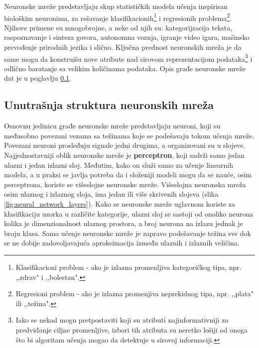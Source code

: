 \documentclass[a4paper]{article}
\begin{document}
Neuronske mreže predstavljaju skup statističkih modela učenja inspirisan biološkim neuronima, za rešavanje klasifikacionih\footnote{Klasifikacioni problem - ako je izlazna promenljiva kategoričkog tipa, npr. ,,zdrav" i ,,bolestan".} i regresionih problema\footnote{Regresioni problem - ako je izlazna promenjiva neprekidnog tipa, npr. ,,plata" ili ,,težina".}. Njihove primene su mnogobrojne, a neke od njih su: kategorijzacija teksta,
 raspoznavanje i sinteza govora, autonomna voznja, igranje video igara, mašinsko prevođenje prirodnih jezika i slično. Ključna prednost neuronskih mreža je da same mogu da konstruišu nove atribute nad sirovom reprezentacijom podataka\footnote{Iako se nekad mogu pretpostaviti koji su atributi najinformativniji za predviđanje ciljne promenljive, izbori tih atributa su neretko lošiji od onoga što bi algoritam učenja mogao da detektuje u sirovoj informaciji.} i odlično baratanje sa velikim količinama podataka. Opis građe neuronske mreže dat je u poglavlju \ref{arhitektura_neuronske_mreze}.


\subsection{Unutrašnja struktura neuronskih mreža}
\label{arhitektura_neuronske_mreze}

Osnovnu jedinicu građe neuronske mreže predstavljaju neuroni, koji su međusobno povezani vezama sa težinama koje se podešavaju tokom učenja mreže. Povezani neuroni prosleđuju signale jedni drugima, a organizovani su u slojeve. Najjednostavniji oblik neuronske mreže je \textbf{perceptron}, koji sadrži samo jedan ulazni i jedan izlazni sloj. Međutim, kako on služi samo za učenje linearnih modela, a u praksi se javlja potreba da i složeniji modeli mogu da se nauče, osim perceptrona, koriste se višeslojne neuronske mreže. Višeslojna neuronska mreža osim ulaznog i izlaznog sloja, ima jedan ili više skrivenih slojeva (slika \ref{fig:neural_network_layers}).
Kako se neuronske mreže uglavnom koriste za klasifikaciju uzorka u različite kategorije, ulazni sloj se sastoji od onoliko neurona kolika je dimenzionalnost ulaznog prostora, a broj neurona na izlazu jednak je broju klasa. Samo učenje neuronske mreže je zapravo podešavanje težina sve dok se ne dobije zadovoljavajuća aproksimacija između ulaznih i izlaznih veličina.
\end{document}

